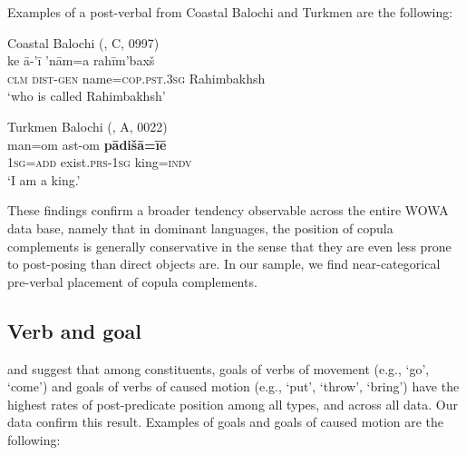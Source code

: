 \documentclass[output=paper,colorlinks,citecolor=brown,draftmode]{langscibook}
\begin{document}
Examples of a post-verbal  from Coastal Balochi and Turkmen are the following:

\ea\label{Balochi:ex:15}
Coastal Balochi (\citealt{nourzaei_balochi_coastal_2021}, C, 0997)\\
\gll ke ā-'ī 'nām=a rahīm'baxš \\
\textsc{clm} \textsc{dist}-\textsc{gen} name=\textsc{cop}.\textsc{pst}.\textsc{3sg} Rahimbakhsh \\
\glt `who is called Rahimbakhsh'
\z


\ea\label{Balochi:ex:16}
Turkmen Balochi (\citealt{haig_balochi_2022}, A, 0022)\\
\gll man=om ast-om \textbf{pādišā=īē} \\
\textsc{1sg}=\textsc{add} exist.\textsc{prs}-\textsc{1sg} king=\textsc{indv} \\
\glt `I am a king.'
\z

\begin{sloppypar}
These findings confirm a broader tendency observable across the entire WOWA data base, namely that in dominant  languages, the position of copula complements is generally conservative in the sense that they are even less prone to post-posing than direct objects are. In our sample, we find near-categorical pre-verbal placement of copula complements.
\end{sloppypar}

\subsection{Verb and goal}\label{Balochi:ss:4.3}

\citet{Korn2022Targets} and \citet{Jahani2018Post-verbal} suggest that among  constituents, goals of verbs of movement (e.g., `go', `come') and goals of verbs of caused motion (e.g., `put', `throw', `bring') have the highest rates of post-predicate position among all  types, and across all data. Our data confirm this result. Examples of goals and goals of caused motion are the following:
\end{document}

